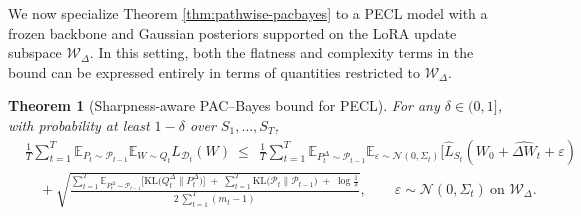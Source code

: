 \documentclass[10pt]{article} %
\newtheorem{theorem}{Theorem}
\begin{document}

We now specialize Theorem \ref{thm:pathwise-pacbayes} to a PECL model with a frozen backbone and Gaussian posteriors supported on the LoRA update subspace $\mathcal{W}_{\Delta}$. In this setting, both the flatness and complexity terms in the bound can be expressed entirely in terms of quantities restricted to $\mathcal{W}_{\Delta}$.
\begin{theorem}[Sharpness-aware PAC--Bayes bound for PECL]
\label{thm:pecl-bound}
For any $\delta\in(0,1]$, with probability at least $1-\delta$ over $S_1,\ldots,S_T$,
\begin{equation}\label{eq:pecl-main}
\begin{aligned}
&\frac{1}{T}\sum_{t=1}^T
\mathbb{E}_{P_t\sim\mathcal P_{t-1}}\mathbb{E}_{W\sim Q_t}L_{\mathcal{D}_t}(W)
\ \le\
\ \frac{1}{T}\sum_{t=1}^T
\mathbb{E}_{P_t^\Delta\sim\mathcal P_{t-1}}
\mathbb{E}_{\varepsilon \sim \mathcal{N}(0, \Sigma_t)}[\hat{L}_{S_t}(W_0 + \hat{\Delta W}_t + \varepsilon)
\\
&\quad +\sqrt{\frac{
\displaystyle \sum_{t=1}^T \mathbb{E}_{P_t^\Delta\sim\mathcal P_{t-1}}\!\Big[\mathrm{KL}\!\big(Q_t^\Delta\|P_t^\Delta\big)\Big]
\;+\;\displaystyle \sum_{t=1}^T \mathrm{KL}\!\big(\mathcal P_t\|\mathcal P_{t-1}\big)
\;+\;\log\!\frac{1}{\delta}
}{2\,\displaystyle\sum_{t=1}^T (m_t-1)}}, \qquad \varepsilon\sim\mathcal N(0,\Sigma_t)\ \text{on } \mathcal W_\Delta.
\end{aligned}
\end{equation}
\end{theorem}

\end{document}
